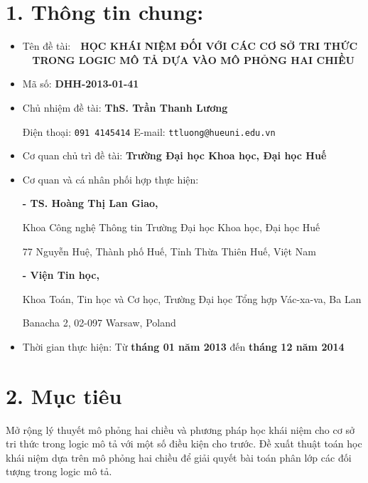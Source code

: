 \section*{1. Thông tin chung:}
\begin{itemize}
	\item Tên đề tài:~~\textbf{HỌC KHÁI NIỆM ĐỐI VỚI CÁC CƠ SỞ TRI THỨC\\
	\mbox{~}\hspace{7ex} TRONG LOGIC MÔ TẢ DỰA VÀO MÔ PHỎNG HAI CHIỀU}\\[-0.8cm]
	\item Mã số: {\bf DHH-2013-01-41}\\[-0.8cm]
	\item Chủ nhiệm đề tài: {\bf ThS. Trần Thanh Lương}
	
	\vspace{-0.05cm}
	Điện thoại: \texttt{091 4145414} \qquad\qquad\qquad\qquad E-mail: \texttt{ttluong@hueuni.edu.vn}\\[-0.8cm]
	\item Cơ quan chủ trì đề tài: {\bf Trường Đại học Khoa học, Đại học Huế}\\[-0.8cm]
	\item Cơ quan và cá nhân phối hợp thực hiện:
	
	{\bf - TS. Hoàng Thị Lan Giao,}
	
	Khoa Công nghệ Thông tin Trường Đại học Khoa học, Đại học Huế
	
	77 Nguyễn Huệ, Thành phố Huế, Tỉnh Thừa Thiên Huế, Việt Nam
	
	{\bf - Viện Tin học,}
	
	Khoa Toán, Tin học và Cơ học, Trường Đại học Tổng hợp Vác-xa-va, Ba Lan
	
	Banacha 2, 02-097 Warsaw, Poland\\[-0.8cm]
	
	\item Thời gian thực hiện: Từ {\bf tháng 01 năm 2013} đến {\bf tháng 12 năm 2014}
\end{itemize}
\section*{2. Mục tiêu}
Mở rộng lý thuyết mô phỏng hai chiều và phương pháp học khái niệm cho cơ sở tri thức trong logic mô tả với một số điều kiện cho trước.
Đề xuất thuật toán học khái niệm dựa trên mô phỏng hai chiều để giải quyết bài toán phân lớp các đối tượng trong logic mô tả.

